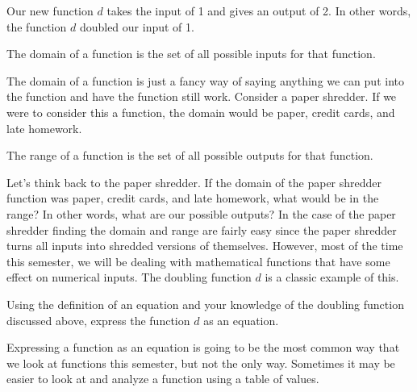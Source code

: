 \noindent
Our new function $d$ takes the input of 1 and gives an output of 2. In other words, the function $d$ doubled our input of 1.
\begin{presentation}
	\begin{defn}[Domain]
		The domain of a function is the set of all possible inputs for that function.
	\end{defn}
\end{presentation}

The domain of a function is just a fancy way of saying anything we can put into the function and have the function still work. Consider a paper shredder. If we were to consider this a function, the domain would be paper, credit cards, and late homework. 
\begin{defn}[Range]
	The range of a function is the set of all possible outputs for that function.
\end{defn}

Let's think back to the paper shredder. If the domain of the paper shredder function was paper, credit cards, and late homework, what would be in the range? In other words, what are our possible outputs? In the case of the paper shredder finding the domain and range are fairly easy since the paper shredder turns all inputs into shredded versions of themselves. However, most of the time this semester, we will be dealing with mathematical functions that have some effect on numerical inputs. The doubling function $d$ is a classic example of this. 

\begin{prblm}
Using the definition of an equation and your knowledge of the doubling function discussed above, express the function $d$ as an equation. \vspace{4cm}
\end{prblm}

Expressing a function as an equation is going to be the most common way that we look at functions this semester, but not the only way. Sometimes it may be easier to look at and analyze a function using a table of values. 

